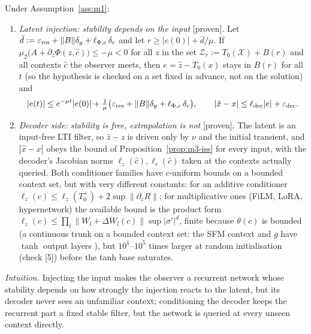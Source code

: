 \begin{proposition}\label{prop:m1-where}
Under Assumption~\ref{ass:m1}:
\begin{enumerate}
\item[(a)] \emph{Latent injection: stability depends on the input} [proven]. Let
$\bar d:=\varepsilon_{\rm res}+\|B\|\delta_y+\ell_{\Phi,c}\,\delta_c$ and let $r\ge|e(0)|+\bar d/\mu$. If
$\mu_2\big(A+\partial_z\Phi(z,\hat c)\big)\le-\mu<0$ for all $z$ in the set $\mathcal Z_r:=T_0(\mathcal X)+B(r)$ and all
contexts $\hat c$ the observer meets, then $e=\hat z-T_0(x)$ stays in $B(r)$ for all $t$ (so the hypothesis is
checked on a set fixed in advance, not on the solution) and
\[
|e(t)|\le e^{-\mu t}|e(0)|+\tfrac1\mu\big(\varepsilon_{\rm res}+\|B\|\delta_y+\ell_{\Phi,c}\,\delta_c\big),\qquad
|\hat x-x|\le\ell_{\rm dec}|e|+\varepsilon_{\rm dec}.
\]
\item[(b)] \emph{Decoder side: stability is free, extrapolation is not} [proven]. The latent is an input-free LTI filter,
so $\hat z-z$ is driven only by $\nu$ and the initial transient, and $|\hat x-x|$ obeys the bound of
Proposition~\ref{prop:m3-iss} for every input, with the decoder's Jacobian norms $\ell_z(\hat c),\ell_c(\hat c)$ taken at
the contexts actually queried. Both conditioner families have $c$-uniform bounds on a bounded context set, but with very
different constants: for an additive conditioner $\ell_z(c)\le\ell_z(T_0^+)+2\sup\|\partial_zR\|$; for multiplicative
ones (FiLM, LoRA, hypernetwork) the available bound is the product form
$\ell_z(c)\le\prod_l\|W_l+\Delta W_l(c)\|\sup|\sigma'|^{d}$, finite because $\theta(c)$ is bounded (a continuous trunk on a
bounded context set: the SFM context and $g$ have $\tanh$ output layers ), but $10^1$--$10^5$ times larger at random initialisation (check [5]) before the tanh base saturates.
\end{enumerate}
\end{proposition}
\noindent\emph{Intuition.} Injecting the input makes the observer a recurrent network whose stability depends on how
strongly the injection reacts to the latent, but its decoder never sees an unfamiliar context; conditioning the decoder
keeps the recurrent part a fixed stable filter, but the network is queried at every unseen context directly.
